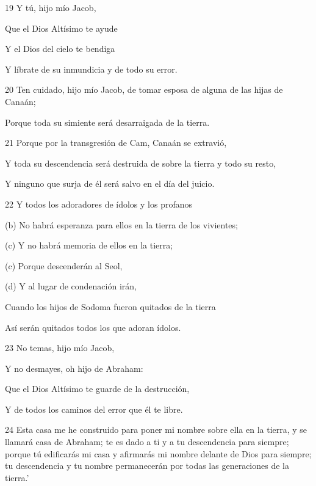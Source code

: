 \par     [Y no tienen corazón.]
\par    
\par 19 Y tú, hijo mío Jacob,  
\par     Que el Dios Altísimo te ayude  
\par     Y el Dios del cielo te bendiga  
\par     Y líbrate de su inmundicia y de todo su error.
\par    
\par 20 Ten cuidado, hijo mío Jacob, de tomar esposa de alguna de las hijas de Canaán;
\par    
\par     Porque toda su simiente será desarraigada de la tierra.
\par    
\par 21 Porque por la transgresión de Cam, Canaán se extravió,  
\par     Y toda su descendencia será destruida de sobre la tierra y todo su resto,  
\par     Y ninguno que surja de él será salvo en el día del juicio.
\par    
\par 22 Y todos los adoradores de ídolos y los profanos  
\par     (b) No habrá esperanza para ellos en la tierra de los vivientes;  
\par     (c) Y no habrá memoria de ellos en la tierra;  
\par     (c) Porque descenderán al Seol,  
\par     (d) Y al lugar de condenación irán,
\par    
\par     Cuando los hijos de Sodoma fueron quitados de la tierra  
\par     Así serán quitados todos los que adoran ídolos.
\par    
\par 23 No temas, hijo mío Jacob,  
\par     Y no desmayes, oh hijo de Abraham:
\par    
\par     Que el Dios Altísimo te guarde de la destrucción,  
\par     Y de todos los caminos del error que él te libre.
\par    
\par 24 Esta casa me he construido para poner mi nombre sobre ella en la tierra, y se llamará casa de Abraham; te es dado a ti y a tu descendencia para siempre; porque tú edificarás mi casa y afirmarás mi nombre delante de Dios para siempre; tu descendencia y tu nombre permanecerán por todas las generaciones de la tierra.'
